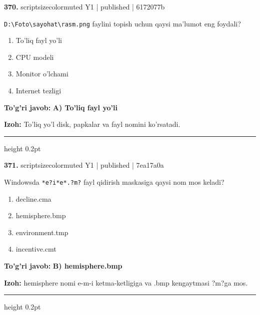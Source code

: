 \documentclass[10pt,a4paper]{article}
\begin{document}
{\bfseries\sffamily\color{ink} 370.} {scriptsizecolor{muted} Y1 | published | 6172077b}
\par
\texttt{D:\textbackslash{}Foto\textbackslash{}sayohat\textbackslash{}rasm.png} faylini topish uchun qaysi ma'lumot eng foydali?
\begin{enumerate}[label=\Alph*),leftmargin=9mm]
\item To'liq fayl yo'li
\item CPU modeli
\item Monitor o'lchami
\item Internet tezligi
\end{enumerate}
\begin{tcolorbox}[enhanced,breakable,colback=teal!4,colframe=teal!60!black,boxrule=0.45pt,arc=1.2mm,left=2.7mm,right=2.7mm,top=1.8mm,bottom=1.8mm,before skip=2mm,after skip=2mm]
{\bfseries\sffamily\color{teal}To'g'ri javob:} \textbf{A) To'liq fayl yo'li}
\par\smallskip
{\bfseries Izoh:} To'liq yo'l disk, papkalar va fayl nomini ko'rsatadi.
\end{tcolorbox}
\vspace{2mm}\hrule height 0.2pt\vspace{3mm}

{\bfseries\sffamily\color{ink} 371.} {scriptsizecolor{muted} Y1 | published | 7ea17a0a}
\par
Windowsda \texttt{*e?i*e*.?m?} fayl qidirish maskasiga qaysi nom mos keladi?
\begin{enumerate}[label=\Alph*),leftmargin=9mm]
\item decline.cma
\item hemisphere.bmp
\item environment.tmp
\item incentive.cmt
\end{enumerate}
\begin{tcolorbox}[enhanced,breakable,colback=teal!4,colframe=teal!60!black,boxrule=0.45pt,arc=1.2mm,left=2.7mm,right=2.7mm,top=1.8mm,bottom=1.8mm,before skip=2mm,after skip=2mm]
{\bfseries\sffamily\color{teal}To'g'ri javob:} \textbf{B) hemisphere.bmp}
\par\smallskip
{\bfseries Izoh:} hemisphere nomi e-m-i ketma-ketligiga va .bmp kengaytmasi ?m?ga mos.
\end{tcolorbox}
\vspace{2mm}\hrule height 0.2pt\vspace{3mm}
\end{document}
